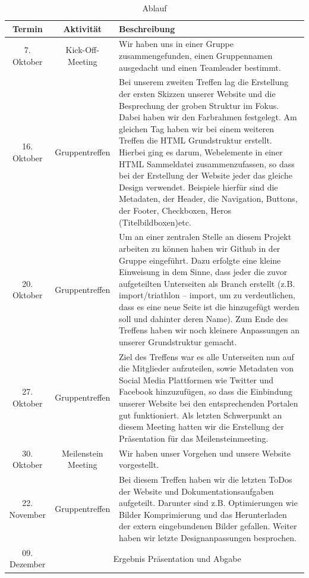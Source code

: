 \documentclass[12pt,a4paper]{article}
\begin{document}
\begin{table}
\begin{tabular}[h]{c|c|p{9cm}}
\hline
\textbf{Termin} & \textbf{Aktivität} & \textbf{Beschreibung} \\
\hline
7. Oktober & Kick-Off-Meeting & Wir haben uns in einer Gruppe zusammengefunden, einen Gruppennamen ausgedacht und einen Teamleader bestimmt. \\
\hline
16. Oktober & Gruppentreffen & Bei unserem zweiten Treffen lag die Erstellung der ersten Skizzen unserer Website und die
Besprechung der groben Struktur im Fokus. Dabei haben wir den Farbrahmen festgelegt. Am gleichen Tag haben wir bei einem weiteren Treffen die HTML Grundstruktur erstellt. Hierbei ging es darum, Webelemente in einer HTML Sammeldatei zusammenzufassen, so dass bei der Erstellung der Website jeder das gleiche Design verwendet.  Beispiele hierfür sind die Metadaten, der Header, die Navigation, Buttons, der Footer, Checkboxen, Heros (Titelbildboxen)etc.\\
\hline
20. Oktober & Gruppentreffen & Um an einer zentralen Stelle an diesem Projekt arbeiten zu können haben wir Github in der Gruppe eingeführt. Dazu erfolgte eine kleine Einweisung in dem Sinne, dass jeder die zuvor aufgeteilten Unterseiten als Branch erstellt (z.B. import/triathlon – import, um zu verdeutlichen, dass es eine neue Seite ist die hinzugefügt werden soll und dahinter deren Name).
Zum Ende des Treffens haben wir noch kleinere Anpassungen an unserer Grundstruktur gemacht.\\
\hline
27. Oktober & Gruppentreffen & Ziel des Treffens war es alle Unterseiten nun auf die Mitglieder aufzuteilen, sowie Metadaten von Social Media Plattformen wie Twitter und Facebook hinzuzufügen, so dass die Einbindung unserer Website bei den entsprechenden Portalen gut funktioniert. Als letzten Schwerpunkt an diesem Meeting hatten wir die Erstellung der Präsentation für das Meilensteinmeeting.\\
\hline
30. Oktober & Meilenstein Meeting & Wir haben unser Vorgehen und unsere Website vorgestellt.\\
\hline
22. November & Gruppentreffen & Bei diesem Treffen haben wir die letzten ToDos der Website und Dokumentationsaufgaben aufgeteilt. Darunter sind z.B. Optimierungen wie Bilder Komprimierung und das Herunterladen der extern eingebundenen Bilder gefallen. Weiter haben wir letzte Designanpassungen besprochen. \\
\hline
09. Dezember & \multicolumn{2}{c}{Ergebnis Präsentation und Abgabe} \\
\hline

\end{tabular}
\caption{Ablauf}
\label{table:Ablauf}
\end{table}
\end{document}
